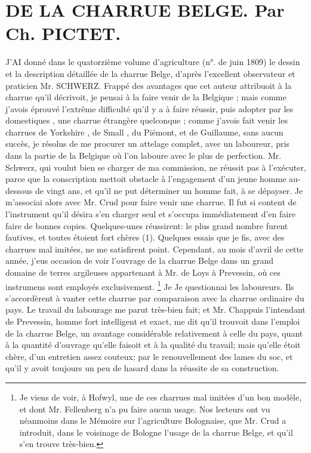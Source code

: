 \setcounter{page}{359}
\section{DE LA CHARRUE BELGE. Par Ch. PICTET.}
J'AI donné dans le quatorzième volume d'agriculture (n°. de juin 1809) le dessin et la description détaillée de la charrue Belge, d'après l'excellent observateur et praticien Mr. SCHWERZ. Frappé des avantages que cet auteur attribuoit à la charrue qu'il décrivoit, je pensai à la faire venir de la Belgique ; mais comme j'avois éprouvé l'extrême difficulté qu'il y a à faire réussir, puis adopter par les domestiques , une charrue étrangère quelconque ; comme j'avois fait venir les charrues de Yorkshire , de Small , du Piémont, et de Guillaume, sans aucun succès, je résolus de me procurer un attelage complet, avec un laboureur, pris dans la\setcounter{page}{360} partie de la Belgique où l'on laboure avec le plus de perfection. Mr. Schwerz, qui voulut bien se charger de ma commission, ne réussit pas à l'exécuter, parce que la conscription mettoit obstacle à l'engagement d'un jeune homme au-dessous de vingt ans, et qu'il ne put déterminer un homme fait, à se dépayser. Je m'associai alors avec Mr. Crud pour faire venir une charrue. Il fut si content de l'instrument qu'il désira s'en charger seul et s'occupa immédiatement d'en faire faire de bonnes copies. Quelques-unes réussirent: le plus grand nombre furent fautives, et toutes étoient fort chères (1). Quelques essais que je fis, avec des charrues mal imitées, ne me satisfirent point. Cependant, au mois d'avril de cette année, j'eus occasion de voir l'ouvrage de la charrue Belge dans un grand domaine de terres argileuses appartenant à Mr. de Loys à Prevessin, où ces instrumens sont employés exclusivement.
\footnote{Je viens de voir, à Hofwyl, une de ces charrues mal imitées d'un bon modèle, et dont Mr. Fellenberg n'a pu faire aucun usage. Nos lecteurs ont vu néanmoins dans le Mémoire sur l'agriculture Bolognaise, que Mr. Crud a introduit, dans le voisinage de Bologne l'usage de la charrue Belge, et qu'il s'en trouve très-bien.}
Je\setcounter{page}{361} Je questionnai les laboureurs. Ils s'accordèrent à vanter cette charrue par comparaison avec la charrue ordinaire du pays. Le travail du labourage me parut très-bien fait; et Mr. Chappuis l'intendant de Prevessin, homme fort intelligent et exact, me dit qu'il trouvoit dans l'emploi de la charrue Belge, un avantage considérable relativement à celle du pays, quant à la quantité d'ouvrage qu'elle faisoit et à la qualité du travail; mais qu'elle étoit chère, d'un entretien assez couteux; par le renouvellement des lames du soc, et qu'il y avoit toujours un peu de hasard dans la réussite de sa construction.
